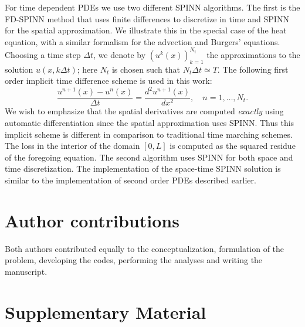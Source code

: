 \documentclass[12pt]{article}
\begin{document}
For time dependent PDEs we use two different SPINN algorithms. The first is the  FD-SPINN method that uses finite differences to discretize in time and SPINN for the spatial approximation. We illustrate this in the special case of the heat equation, with a similar formalism for the advection and Burgers' equations. Choosing a time step $\Delta t$, we denote by $(u^k(x))_{k=1}^{N_t}$ the approximations to the solution $u(x, k\Delta t)$; here $N_t$ is chosen such that $N_t \Delta t \simeq T$. The following first order implicit time difference scheme is used in this work:
\begin{displaymath}
\frac{u^{n+1}(x) - u^n(x)}{\Delta t} = \frac{d^2 u^{n+1}(x)}{d x^2}, \quad n = 1, \ldots, N_t.
\end{displaymath}
We wish to emphasize that the spatial derivatives are computed \emph{exactly} using automatic differentiation since the spatial approximation uses SPINN. Thus this implicit scheme is different in comparison to traditional time marching schemes. The loss in the interior of the domain $[0,L]$ is computed as the squared residue of the foregoing equation. The second algorithm uses SPINN for both space and time discretization. The implementation of the space-time SPINN solution is similar to the implementation of second order PDEs described earlier.

\section*{Author contributions}
Both authors contributed equally to the conceptualization, formulation of the problem, developing the codes, performing the analyses and writing the manuscript.  




\newpage
\section*{Supplementary Material}
\appendix
\end{document}

